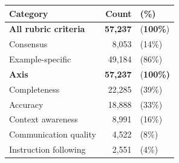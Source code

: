 {
\setlength{\tabcolsep}{2pt} %
\begin{tabular}{lrl}

\toprule
Category & Count &  (\%) \\
\midrule
\textbf{All rubric criteria} & \textbf{57,237} & (\textbf{100\%}) \\
\quad Consensus & 8,053 & (14\%) \\
\vspace{2mm}
\quad Example-specific & 49,184  &  (86\%) \\
\textbf{Axis} & \textbf{57,237} & (\textbf{100\%)} \\
\quad Completeness & 22,285 &  (39\%) \\
\quad Accuracy & 18,888 & (33\%) \\
\quad Context awareness & 8,991 & (16\%) \\
\quad Communication quality & 4,522 & (8\%) \\
\quad Instruction following & 2,551 & (4\%) \\
\bottomrule
\end{tabular}
}
